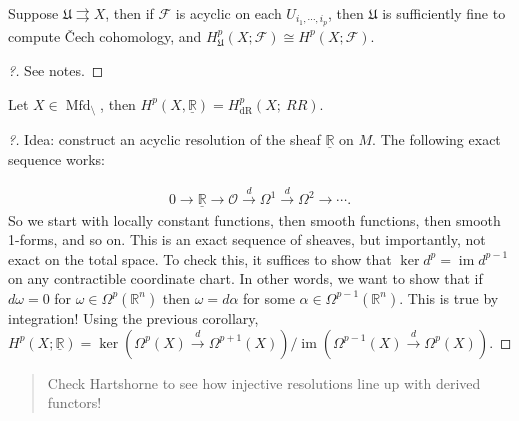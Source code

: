 \begin{corollary}

Suppose \(\mathfrak{U}\rightrightarrows X\), then if \(\mathcal{F}\) is
acyclic on each \(U_{i_1, \cdots, i_p}\), then \(\mathfrak{U}\) is
sufficiently fine to compute Čech cohomology, and
\(H^p_{\mathfrak{U}}(X; \mathcal{F}) \cong H^p(X; \mathcal{F})\).

\end{corollary}

\begin{proof}[?]

See notes.

\end{proof}

\begin{corollary}[of corollary]

Let \(X \in {\operatorname{Mfd}}_\setminus\), then
\(H^p(X, \underline{{\mathbb{R}}}) = H^p_{\mathrm{dR}}(X;\ RR)\).

\end{corollary}

\begin{proof}[?]

Idea: construct an acyclic resolution of the sheaf
\(\underline{{\mathbb{R}}}\) on \(M\). The following exact sequence
works:

\begin{align*}
0 \to \underline{{\mathbb{R}}} \to {\mathcal{O}}\xrightarrow{d} \Omega^1 \xrightarrow{d} \Omega^2 \to \cdots
.\end{align*}
So we start with locally constant functions, then smooth functions, then
smooth 1-forms, and so on. This is an exact sequence of sheaves, but
importantly, not exact on the total space. To check this, it suffices to
show that \(\ker d^p = \operatorname{im}d^{p-1}\) on any contractible
coordinate chart. In other words, we want to show that if \(d \omega=0\)
for \(\omega\in \Omega^p({\mathbb{R}}^n)\) then \(\omega= d \alpha\) for
some \(\alpha\in \Omega^{p-1}({\mathbb{R}}^n)\). This is true by
integration! Using the previous corollary,
\(H^p(X; \underline{{\mathbb{R}}}) = \ker(\Omega^p(X) \xrightarrow{d} \Omega^{p+1}(X) ) / \operatorname{im}(\Omega^{p-1}(X) \xrightarrow{d} \Omega^p(X))\).

\end{proof}

\begin{quote}
Check Hartshorne to see how injective resolutions line up with derived
functors!
\end{quote}

